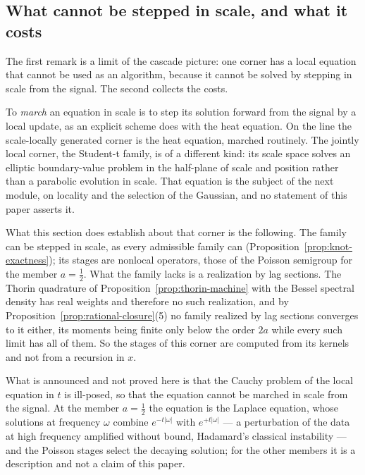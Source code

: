 \subsection{What cannot be stepped in scale, and what it costs}\label{sec:costs}

The first remark is a limit of the cascade picture: one corner has a local equation that
cannot be used as an algorithm, because it cannot be solved by stepping in scale from the
signal. The second collects the costs.

\begin{remark}\label{rem:cannot-march}
To \emph{march} an equation in scale is to step its solution forward from the signal by a local
update, as an explicit scheme does with the heat equation. On the line the scale-locally generated
corner is the heat equation, marched routinely. The
jointly local corner, the Student-t family, is of a different kind: its scale space solves an
elliptic boundary-value problem in the half-plane of scale and position rather than a
parabolic evolution in scale. That equation is the subject of the next module, on locality and the
selection of the Gaussian, and no statement of this paper asserts it.

What this section does establish about that corner is the following. The
family can be stepped in scale, as
every admissible family can (Proposition~\ref{prop:knot-exactness}); its stages are nonlocal
operators, those of the Poisson semigroup for the member $a = \tfrac12$. What the family lacks is a
realization by lag
sections. The Thorin quadrature of Proposition~\ref{prop:thorin-machine} with the Bessel
spectral density has real weights and therefore no such realization, and by
Proposition~\ref{prop:rational-closure}(5) no family realized by lag sections converges to it
either, its moments being finite only below the order $2a$ while every such limit has all of
them. So the stages of this corner are computed from its kernels and not from a recursion
in $x$.

What is announced and not proved here is that the Cauchy problem of the local equation in $t$ is
ill-posed, so that the equation cannot be marched in scale from the signal. At the member
$a = \tfrac12$ the equation is the Laplace equation, whose solutions at frequency $\omega$ combine
$e^{-t|\omega|}$ with $e^{+t|\omega|}$ --- a perturbation of the data at high frequency amplified
without bound, Hadamard's classical instability --- and the Poisson stages select the decaying
solution; for the other members it is a description and not a claim of this paper.
\end{remark}

